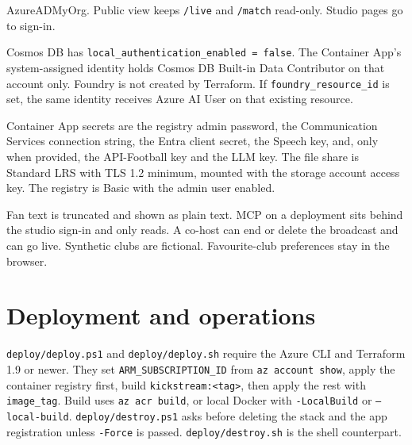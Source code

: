 \documentclass[11pt]{article}
\begin{document}
\begin{center}
\end{center}
{\small\color{Muted} AzureADMyOrg. Public view keeps \texttt{/live} and \texttt{/match} read-only. Studio pages go to sign-in.\par}

Cosmos DB has \texttt{local\_authentication\_enabled = false}.
The Container App's system-assigned identity holds Cosmos DB Built-in Data Contributor
on that account only.
Foundry is not created by Terraform.
If \texttt{foundry\_resource\_id} is set, the same identity receives Azure AI User
on that existing resource.

Container App secrets are the registry admin password, the Communication Services
connection string, the Entra client secret, the Speech key, and, only when
provided, the API-Football key and the LLM key.
The file share is Standard LRS with TLS 1.2 minimum, mounted with the storage
account access key.
The registry is Basic with the admin user enabled.

Fan text is truncated and shown as plain text.
MCP on a deployment sits behind the studio sign-in and only reads.
A co-host can end or delete the broadcast and can go live.
Synthetic clubs are fictional.
Favourite-club preferences stay in the browser.

\section{Deployment and operations}

\texttt{deploy/deploy.ps1} and \texttt{deploy/deploy.sh} require the Azure CLI
and Terraform 1.9 or newer.
They set \texttt{ARM\_SUBSCRIPTION\_ID} from \texttt{az account show}, apply the
container registry first, build \texttt{kickstream:<tag>}, then apply the rest
with \texttt{image\_tag}.
Build uses \texttt{az acr build}, or local Docker with \texttt{-LocalBuild} or
\texttt{--local-build}.
\texttt{deploy/destroy.ps1} asks before deleting the stack and the app registration
unless \texttt{-Force} is passed.
\texttt{deploy/destroy.sh} is the shell counterpart.
\end{document}
